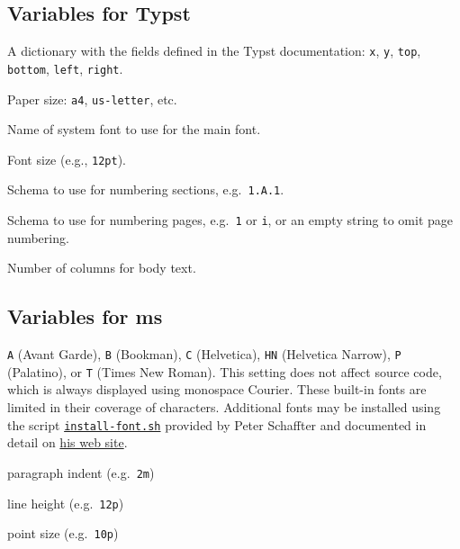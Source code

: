 \documentclass[
  b5paper
]{book}
\providecommand{\tightlist}{%
  \setlength{\itemsep}{0pt}\setlength{\parskip}{0pt}}
\begin{document}
\subsection{Variables for Typst}\label{variables-for-typst}

\begin{description}
\tightlist
\item[\texttt{margin}]
A dictionary with the fields defined in the Typst documentation:
\texttt{x}, \texttt{y}, \texttt{top}, \texttt{bottom}, \texttt{left},
\texttt{right}.
\item[\texttt{papersize}]
Paper size: \texttt{a4}, \texttt{us-letter}, etc.
\item[\texttt{mainfont}]
Name of system font to use for the main font.
\item[\texttt{fontsize}]
Font size (e.g., \texttt{12pt}).
\item[\texttt{section-numbering}]
Schema to use for numbering sections, e.g.~\texttt{1.A.1}.
\item[\texttt{page-numbering}]
Schema to use for numbering pages, e.g.~\texttt{1} or \texttt{i}, or an
empty string to omit page numbering.
\item[\texttt{columns}]
Number of columns for body text.
\end{description}

\subsection{Variables for ms}\label{variables-for-ms}

\begin{description}
\tightlist
\item[\texttt{fontfamily}]
\texttt{A} (Avant Garde), \texttt{B} (Bookman), \texttt{C} (Helvetica),
\texttt{HN} (Helvetica Narrow), \texttt{P} (Palatino), or \texttt{T}
(Times New Roman). This setting does not affect source code, which is
always displayed using monospace Courier. These built-in fonts are
limited in their coverage of characters. Additional fonts may be
installed using the script
\href{https://www.schaffter.ca/mom/bin/install-font.sh}{\texttt{install-font.sh}}
provided by Peter Schaffter and documented in detail on
\href{https://www.schaffter.ca/mom/momdoc/appendices.html\#steps}{his
web site}.
\item[\texttt{indent}]
paragraph indent (e.g.~\texttt{2m})
\item[\texttt{lineheight}]
line height (e.g.~\texttt{12p})
\item[\texttt{pointsize}]
point size (e.g.~\texttt{10p})
\end{description}
\end{document}
